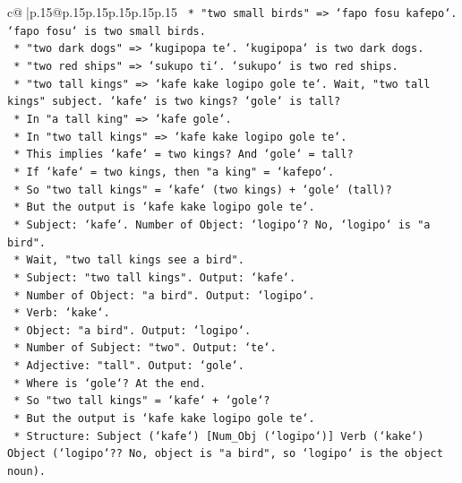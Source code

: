 \documentclass{article}
\begin{document}
{\begin{supertabular}{c@{$\;$}|p{.15\linewidth}@{}p{.15\linewidth}p{.15\linewidth}p{.15\linewidth}p{.15\linewidth}p{.15\linewidth}}
{{{\texttt{            *   "two small birds" => `fapo fosu kafepo`. `fapo fosu` is two small birds.} \\
\texttt{            *   "two dark dogs" => `kugipopa te`. `kugipopa` is two dark dogs.} \\
\texttt{            *   "two red ships" => `sukupo ti`. `sukupo` is two red ships.} \\
\texttt{            *   "two tall kings" => `kafe kake logipo gole te`. Wait, "two tall kings" subject. `kafe` is two kings? `gole` is tall?} \\
\texttt{            *   In "a tall king" => `kafe gole`.} \\
\texttt{            *   In "two tall kings" => `kafe kake logipo gole te`.} \\
\texttt{            *   This implies `kafe` = two kings? And `gole` = tall?} \\
\texttt{            *   If `kafe` = two kings, then "a king" = `kafepo`.} \\
\texttt{            *   So "two tall kings" = `kafe` (two kings) + `gole` (tall)?} \\
\texttt{            *   But the output is `kafe kake logipo gole te`.} \\
\texttt{            *   Subject: `kafe`. Number of Object: `logipo`? No, `logipo` is "a bird".} \\
\texttt{            *   Wait, "two tall kings see a bird".} \\
\texttt{            *   Subject: "two tall kings". Output: `kafe`.} \\
\texttt{            *   Number of Object: "a bird". Output: `logipo`.} \\
\texttt{            *   Verb: `kake`.} \\
\texttt{            *   Object: "a bird". Output: `logipo`.} \\
\texttt{            *   Number of Subject: "two". Output: `te`.} \\
\texttt{            *   Adjective: "tall". Output: `gole`.} \\
\texttt{            *   Where is `gole`? At the end.} \\
\texttt{            *   So "two tall kings" = `kafe` + `gole`?} \\
\texttt{            *   But the output is `kafe kake logipo gole te`.} \\
\texttt{            *   Structure: Subject (`kafe`) {[}Num\_Obj (`logipo`){]} Verb (`kake`) Object (`logipo`?? No, object is "a bird", so `logipo` is the object noun).} \\
}}}
\end{supertabular}}
\end{document}

